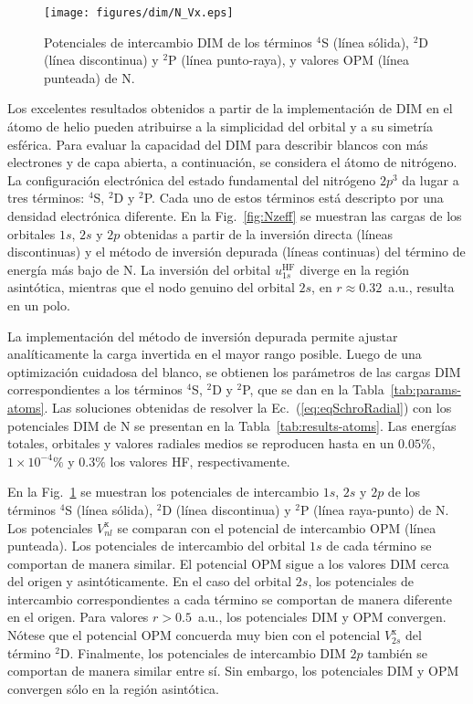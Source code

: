 \begin{figure}[t]
\centering
\texttt{[image: figures/dim/N\_Vx.eps]}
\caption[Potenciales de intercambio DIM de N.]
{Potenciales de intercambio DIM de los términos $^4$S (línea sólida), 
$^2$D (línea discontinua) y $^2$P (línea punto-raya), y valores OPM 
(línea punteada) de N.}
\label{fig:NVx}
\end{figure}

Los excelentes resultados obtenidos a partir de la implementación de DIM 
en el átomo de helio pueden atribuirse a la simplicidad del orbital y a 
su simetría esférica. Para evaluar la capacidad del DIM para describir 
blancos con más electrones y de capa abierta, a continuación, se 
considera el átomo de nitrógeno. 
La configuración electrónica del estado fundamental del nitrógeno $2p^3$ 
da lugar a tres términos: $^4$S, $^2$D y $^2$P. Cada uno de estos 
términos está descripto por una densidad electrónica diferente. En la 
Fig.~\ref{fig:Nzeff} se muestran las cargas de los orbitales $1s$, $2s$ 
y $2p$ obtenidas a partir de la inversión directa (líneas discontinuas) 
y el método de inversión depurada (líneas continuas) del término de 
energía más bajo de N. La inversión del orbital $u_{1s}^{\mathrm{HF}}$ 
diverge en la región asintótica, mientras que el nodo genuino del 
orbital $2s$, en $r\approx 0.32$~a.u., resulta en un polo. 

La implementación del método de inversión depurada permite ajustar 
analíticamente la carga invertida en el mayor rango posible. Luego de 
una optimización cuidadosa del blanco, se obtienen los parámetros de las 
cargas DIM correspondientes a los términos $^4$S, $^2$D y $^2$P, que se 
dan en la Tabla~\ref{tab:params-atoms}. Las soluciones obtenidas de 
resolver la Ec.~(\ref{eq:eqSchroRadial}) con los potenciales DIM de N 
se presentan en la Tabla~\ref{tab:results-atoms}. Las energías totales, 
orbitales y valores radiales medios se reproducen hasta en un $0.05\%$, 
$1\times 10^{-4}\%$ y $0.3\%$ los valores HF, respectivamente. 

En la Fig.~\ref{fig:NVx} se muestran los potenciales de intercambio 
$1s$, $2s$ y $2p$ de los términos $^4$S (línea sólida), $^2$D (línea 
discontinua) y $^2$P (línea raya-punto) de N. Los potenciales 
$V_{nl}^{\mathrm{x}}$ se comparan con el potencial de intercambio OPM 
(línea punteada). Los potenciales de intercambio del orbital $1s$ de 
cada término se comportan de manera similar. El potencial OPM sigue a 
los valores DIM cerca del origen y asintóticamente. En el caso del 
orbital $2s$, los potenciales de intercambio correspondientes a cada 
término se comportan de manera diferente en el origen. Para valores 
$r>0.5$~a.u., los potenciales DIM y OPM convergen. Nótese que el 
potencial OPM concuerda muy bien con el potencial $V_{2s}^{\mathrm{x}}$ 
del término $^2$D. Finalmente, los potenciales de intercambio DIM $2p$ 
también se comportan de manera similar entre sí. Sin embargo, los 
potenciales DIM y OPM convergen sólo en la región asintótica. 

